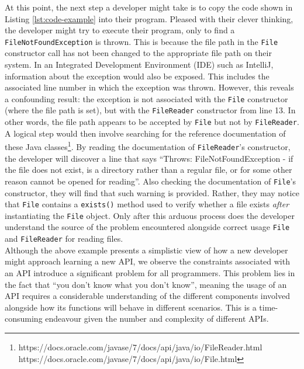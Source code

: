 At this point, the next step a developer might take is to copy the code shown in Listing \ref{lst:code-example} into their program. Pleased with their clever thinking, the developer might try to execute their program, only to find a \lstinline{FileNotFoundException} is thrown. This is because the file path in the \lstinline{File} constructor call has not been changed to the appropriate file path on their system. In an Integrated Development Environment (IDE) such as IntelliJ,  information about the exception would also be exposed. This includes the associated line number in which the exception was thrown. However, this reveals a confounding result: the exception is not associated with the \lstinline{File} constructor (where the file path is set), but with the \lstinline{FileReader} constructor from line 13. In other words, the file path appears to be accepted by \lstinline{File} but not by \lstinline{FileReader}. A logical step would then involve searching for the reference documentation of these Java classes\footnote{https://docs.oracle.com/javase/7/docs/api/java/io/FileReader.html \\\indent https://docs.oracle.com/javase/7/docs/api/java/io/File.html}. By reading the documentation of \lstinline{FileReader}'s constructor, the developer will discover a line that says ``Throws: FileNotFoundException - if the file does not exist, is a directory rather than a regular file, or for some other reason cannot be opened for reading''. Also checking the documentation of \lstinline{File}'s constructor, they will find that such warning is provided. Rather, they may notice that \lstinline{File} contains a \lstinline{exists()} method used to verify whether a file exists \textit{after} instantiating the \lstinline{File} object. Only after this arduous process does the developer understand the source of the problem encountered alongside correct usage \lstinline{File} and \lstinline{FileReader} for reading files.\\
Although the above example presents a simplistic view of how a new developer might approach learning a new API, we observe the constraints associated with an API introduce a significant problem for all programmers. This problem lies in the fact that ``you don't know what you don't know'', meaning the usage of an API requires a considerable understanding of the different components involved alongside how its functions will behave in different scenarios. This is a time-consuming endeavour given the number and complexity of different APIs.\\

